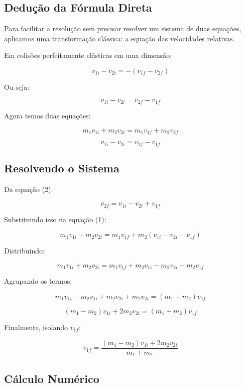 \documentclass[a4paper,12pt]{article}
\begin{document}
\begin{flushleft}
\subsection*{Dedução da Fórmula Direta}

Para facilitar a resolução sem precisar resolver um sistema de duas equações, aplicamos uma transformação clássica: a equação das velocidades relativas.

Em colisões perfeitamente elásticas em uma dimensão:

\[
v_{1i} - v_{2i} = -(v_{1f} - v_{2f})
\]

Ou seja:

\[
v_{1i} - v_{2i} = v_{2f} - v_{1f}
\]

Agora temos duas equações:

\begin{equation}
m_1v_{1i} + m_2v_{2i} = m_1v_{1f} + m_2v_{2f} \tag{1}
\end{equation}

\begin{equation}
v_{1i} - v_{2i} = v_{2f} - v_{1f} \tag{2}
\end{equation}

\subsection*{Resolvendo o Sistema}

Da equação (2):

\[
v_{2f} = v_{1i} - v_{2i} + v_{1f}
\]

Substituindo isso na equação (1):

\[
m_1v_{1i} + m_2v_{2i} = m_1v_{1f} + m_2(v_{1i} - v_{2i} + v_{1f})
\]

Distribuindo:

\[
m_1v_{1i} + m_2v_{2i} = m_1v_{1f} + m_2v_{1i} - m_2v_{2i} + m_2v_{1f}
\]

Agrupando os termos:

\[
m_1v_{1i} - m_2v_{1i} + m_2v_{2i} + m_2v_{2i} = (m_1 + m_2)v_{1f}
\]

\[
(m_1 - m_2)v_{1i} + 2m_2v_{2i} = (m_1 + m_2)v_{1f}
\]

Finalmente, isolando \(v_{1f}\):

\[
v_{1f} = \frac{(m_1 - m_2)v_{1i} + 2m_2v_{2i}}{m_1 + m_2}
\]

\subsection*{Cálculo Numérico}


\end{flushleft}
\end{document}
